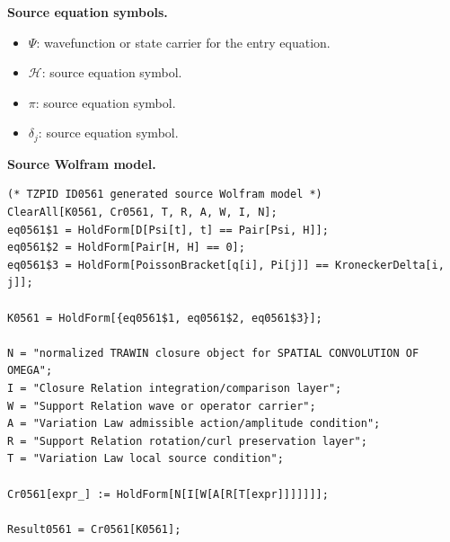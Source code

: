 \begin{minipage}[t]{0.49\linewidth}
\begingroup
\small
\raggedright
\textbf{Source equation symbols.}\par
\begin{itemize}[leftmargin=1.35em,itemsep=1pt,topsep=1pt,parsep=0pt]
    \item $\Psi$: wavefunction or state carrier for the entry equation.
    \item $\mathcal{H}$: source equation symbol.
    \item $\pi$: source equation symbol.
    \item $\delta_{j}$: source equation symbol.
\end{itemize}
\endgroup
\end{minipage}\hfill
\begin{minipage}[t]{0.47\linewidth}
\begingroup
\scriptsize
\raggedright
\textbf{Source Wolfram model.}\par
\begin{Verbatim}[fontsize=\tiny,breaklines=true,breakanywhere=true]
(* TZPID ID0561 generated source Wolfram model *)
ClearAll[K0561, Cr0561, T, R, A, W, I, N];
eq0561$1 = HoldForm[D[Psi[t], t] == Pair[Psi, H]];
eq0561$2 = HoldForm[Pair[H, H] == 0];
eq0561$3 = HoldForm[PoissonBracket[q[i], Pi[j]] == KroneckerDelta[i, j]];

K0561 = HoldForm[{eq0561$1, eq0561$2, eq0561$3}];

N = "normalized TRAWIN closure object for SPATIAL CONVOLUTION OF OMEGA";
I = "Closure Relation integration/comparison layer";
W = "Support Relation wave or operator carrier";
A = "Variation Law admissible action/amplitude condition";
R = "Support Relation rotation/curl preservation layer";
T = "Variation Law local source condition";

Cr0561[expr_] := HoldForm[N[I[W[A[R[T[expr]]]]]]];

Result0561 = Cr0561[K0561];
\end{Verbatim}
\endgroup
\end{minipage}

